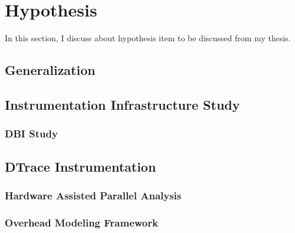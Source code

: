 \section{Hypothesis} \label{sec:hypo} 

In this section, I discuss about hypothesis item to be discussed from my
thesis.

\subsection{\sreplica Generalization}

\subsection{Instrumentation Infrastructure Study}
\subsubsection{DBI Study}
\subsection{DTrace Instrumentation}
\subsubsection{Hardware Assisted Parallel Analysis}
\subsubsection{Overhead Modeling Framework}
